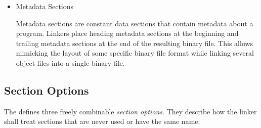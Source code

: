 \begin{itemize}
\item Metadata Sections\alignright{}\nopagebreak

Metadata sections are constant data sections that contain metadata about a program.
Linkers place heading metadata sections at the beginning and trailing metadata sections at the end of the resulting binary file.
This allows mimicking the layout of some specific binary file format while linking several object files into a single binary file.

\end{itemize}

\subsection{Section Options}\label{sec:objsectionoptions}

The \ecs{} defines three freely combinable \emph{section options}.
They describe how the linker shall treat sections that are never used or have the same name:

